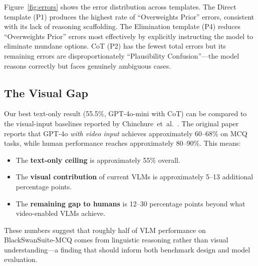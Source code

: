 Figure~\ref{fig:errors} shows the error distribution across templates.
The Direct template (P1) produces the highest rate of ``Overweights Prior'' errors, consistent with its lack of reasoning scaffolding.
The Elimination template (P4) reduces ``Overweights Prior'' errors most effectively by explicitly instructing the model to eliminate mundane options.
CoT (P2) has the fewest total errors but its remaining errors are disproportionately ``Plausibility Confusion''---the model reasons correctly but faces genuinely ambiguous cases.

\subsection{The Visual Gap}
\label{sec:visualgap}

Our best text-only result (55.5\%, GPT-4o-mini with CoT) can be compared to the visual-input baselines reported by Chinchure~et~al.~\cite{chinchure2025black}.
The original paper reports that GPT-4o \emph{with video input} achieves approximately 60--68\% on MCQ tasks, while human performance reaches approximately 80--90\%.
This means:

\begin{itemize}[leftmargin=*,itemsep=1pt]
    \item The \textbf{text-only ceiling} is approximately 55\% overall.
    \item The \textbf{visual contribution} of current VLMs is approximately 5--13 additional percentage points.
    \item The \textbf{remaining gap to humans} is 12--30 percentage points beyond what video-enabled VLMs achieve.
\end{itemize}

These numbers suggest that roughly half of VLM performance on BlackSwanSuite-MCQ comes from linguistic reasoning rather than visual understanding---a finding that should inform both benchmark design and model evaluation.
